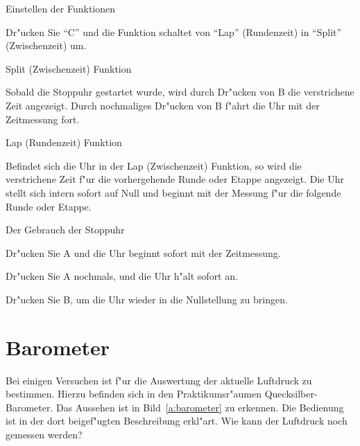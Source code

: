 \begin{description*}

%

\item Einstellen der Funktionen

Dr"ucken Sie "`C"' und die Funktion schaltet von "`Lap"' (Rundenzeit)
in "`Split"' (Zwischenzeit) um.

\item Split (Zwischenzeit) Funktion

Sobald die Stoppuhr gestartet wurde, wird durch Dr"ucken von B die
verstrichene Zeit angezeigt. Durch nochmaliges Dr"ucken von B f"ahrt
die Uhr mit der Zeitmessung fort.

\item Lap (Rundenzeit) Funktion

Befindet sich die Uhr in der Lap (Zwischenzeit) Funktion, so wird
die verstrichene Zeit f"ur die vorhergehende Runde oder Etappe
angezeigt. Die Uhr stellt sich intern sofort auf Null und beginnt
mit der Messung f"ur die folgende Runde oder Etappe.

\item Der Gebrauch der Stoppuhr
%
\begin{itemize*}
  \item Dr"ucken Sie A und die Uhr beginnt sofort mit der
Zeitmessung.
  \item Dr"ucken Sie A nochmals, und die Uhr h"alt sofort an.
  \item Dr"ucken Sie B, um die Uhr
wieder in die Nullstellung zu bringen.

\end{itemize*}

\end{description*}



\section{Barometer}


Bei einigen Versuchen ist f"ur die Auswertung der aktuelle
Luftdruck zu bestimmen. Hierzu befinden sich in
den Praktikumsr"aumen Quecksilber-Barometer. Das
Aussehen ist in Bild~\ref{a:barometer} zu erkennen. Die Bedienung
ist in der dort beigef"ugten Beschreibung erkl"art. Wie kann der
Luftdruck noch gemessen werden?

